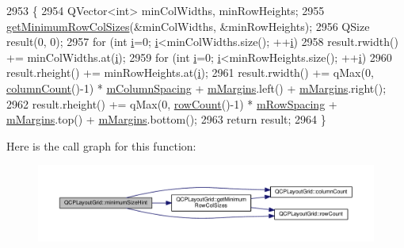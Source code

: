 \begin{DoxyCode}
2953 \{
2954   QVector<int> minColWidths, minRowHeights;
2955   \hyperlink{class_q_c_p_layout_grid_ac645fb9b1c4257b08a9f09dee10b9b3f}{getMinimumRowColSizes}(&minColWidths, &minRowHeights);
2956   QSize result(0, 0);
2957   \textcolor{keywordflow}{for} (\textcolor{keywordtype}{int} \hyperlink{_comparision_pictures_2_createtest_image_8m_a6f6ccfcf58b31cb6412107d9d5281426}{i}=0; \hyperlink{_comparision_pictures_2_createtest_image_8m_a6f6ccfcf58b31cb6412107d9d5281426}{i}<minColWidths.size(); ++\hyperlink{_comparision_pictures_2_createtest_image_8m_a6f6ccfcf58b31cb6412107d9d5281426}{i})
2958     result.rwidth() += minColWidths.at(\hyperlink{_comparision_pictures_2_createtest_image_8m_a6f6ccfcf58b31cb6412107d9d5281426}{i});
2959   \textcolor{keywordflow}{for} (\textcolor{keywordtype}{int} \hyperlink{_comparision_pictures_2_createtest_image_8m_a6f6ccfcf58b31cb6412107d9d5281426}{i}=0; \hyperlink{_comparision_pictures_2_createtest_image_8m_a6f6ccfcf58b31cb6412107d9d5281426}{i}<minRowHeights.size(); ++\hyperlink{_comparision_pictures_2_createtest_image_8m_a6f6ccfcf58b31cb6412107d9d5281426}{i})
2960     result.rheight() += minRowHeights.at(\hyperlink{_comparision_pictures_2_createtest_image_8m_a6f6ccfcf58b31cb6412107d9d5281426}{i});
2961   result.rwidth() += qMax(0, \hyperlink{class_q_c_p_layout_grid_ac39074eafd148b82d0762090f258189e}{columnCount}()-1) * \hyperlink{class_q_c_p_layout_grid_ae9ac48f0791be07ead0a96dbd5622770}{mColumnSpacing} + 
      \hyperlink{class_q_c_p_layout_element_ac2a32b99ee527ca5dfff9da03628fe94}{mMargins}.left() + \hyperlink{class_q_c_p_layout_element_ac2a32b99ee527ca5dfff9da03628fe94}{mMargins}.right();
2962   result.rheight() += qMax(0, \hyperlink{class_q_c_p_layout_grid_af8e6c7a05864ebe610c87756c7b9079c}{rowCount}()-1) * \hyperlink{class_q_c_p_layout_grid_a8b67f183f4645739cc4c794d75843b40}{mRowSpacing} + 
      \hyperlink{class_q_c_p_layout_element_ac2a32b99ee527ca5dfff9da03628fe94}{mMargins}.top() + \hyperlink{class_q_c_p_layout_element_ac2a32b99ee527ca5dfff9da03628fe94}{mMargins}.bottom();
2963   \textcolor{keywordflow}{return} result;
2964 \}
\end{DoxyCode}


Here is the call graph for this function\+:\nopagebreak
\begin{figure}[H]
\begin{center}
\leavevmode
\includegraphics[width=350pt]{class_q_c_p_layout_grid_a67aae235fb4dd9a479aafe07462ef9ee_cgraph}
\end{center}
\end{figure}




